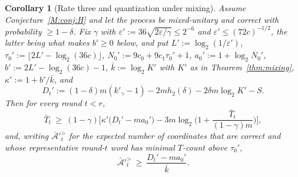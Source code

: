 \documentclass[aps,prx,twocolumn,superscriptaddress,nofootinbib,longbibliography]{revtex4-2}
\theoremstyle{plain}
\newtheorem{corollary}{Corollary}
\theoremstyle{definition}
\theoremstyle{remark}
\begin{document}
\begin{corollary}[Rate three and quantization under mixing]\label{cor:mixq}
Assume Conjecture~\ref{M:conj:H} and let the process be mixed-unitary and correct with probability $\ge1-\delta$. Fix $\gamma$ with $\varepsilon':=36\sqrt{2\varepsilon/\gamma}\le2^{-6}$ and $\varepsilon'\le(72c)^{-1/2}$, the latter being what makes $b'\ge0$ below, and put $L':=\log_2(1/\varepsilon')$, $\tau_0':=\lfloor2L'-\log_2(36c)\rfloor$, $N_0':=9c_0+9c_1\tau_0'+1$, $a_0':=1+\log_2N_0'$, $b':=2L'-\log_2(36c)-1$, $\bar k:=\log_2K'$ with $K'$ as in Theorem~\ref{thm:mixing}, $\kappa':=1+b'/\bar k$, and
\[
D_t':=(1-\delta)m(k'_\gamma-1)-2mh_2(\delta)-2\delta m\log_2K'-S.
\]
Then for every round $t<r$,
\begin{equation}\label{eq:mixrate}
\bar T_t\ \ge\ (1-\gamma)\Big[\kappa'\big(D_t'-ma_0'\big)-3m\log_2\Big(1+\frac{\bar T_t}{(1-\gamma)m}\Big)\Big],
\end{equation}
and, writing $\bar{\mathcal A}'^{>}_t$ for the expected number of coordinates that are correct and whose representative round-$t$ word has minimal $T$-count above $\tau_0'$,
\begin{equation}\label{eq:mixactive}
\bar{\mathcal A}'^{>}_t\ \ge\ \frac{D_t'-ma_0'}{\bar k}.
\end{equation}
\end{corollary}
\end{document}
